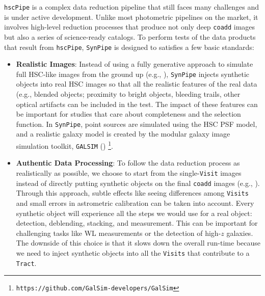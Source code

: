 \documentclass[useamsfonts]{pasj01}
\def\hscpipe{\texttt{hscPipe}}
\def\synpipe{\texttt{SynPipe}}
\def\coadd{\texttt{coadd}}
\def\tract{\texttt{Tract}}
\def\visit{\texttt{Visit}}
\def\visits{\texttt{Visits}}
\def\galsim{\texttt{G}{\scriptsize \texttt{AL}}\texttt{S}{\scriptsize \texttt{IM}}}
\begin{document}
    \hscpipe{} is a complex data reduction pipeline that still faces many challenges
    and is under active development.
    Unlike most photometric pipelines on the market, it involves high-level reduction
    processes that produce not only deep \coadd{} images but also a series of
    science-ready catalogs. 
    To perform tests of the data products that result from \hscpipe{}, \synpipe{} is 
    designed to satisfies a few basic standards:

    \begin{itemize}

        \item \textbf{Realistic Images}:
            Instead of using a fully generative approach to simulate full HSC-like
            images from the ground up (e.g., \citealt{Chang2015}), \synpipe{} injects
            synthetic objects into real HSC images so that all the realistic
            features of the real data (e.g., blended objects; proximity to bright
            objects, bleeding trails, other optical artifacts can be included in the
            test.
            The impact of these features can be important for studies that care about 
            completeness and the selection function.
            In \synpipe{}, point sources are simulated using the HSC PSF model,
            and a realistic galaxy model is created by the modular galaxy image
            simulation toolkit, \galsim{} (\citealt{Rowe2015})
            \footnote{\texttt{https://github.com/GalSim-developers/GalSim}}.

        \item \textbf{Authentic Data Processing}:
            To follow the data reduction process as realistically as possible, we 
            choose to start from the single-\visit{} images instead of directly putting 
            synthetic objects on the final \coadd{} images 
            (e.g., \citealt{Suchyta2016}).
            Through this approach, subtle effects like seeing differences among
            \visits{} and small errors in astrometric calibration can be taken
            into account.
            Every synthetic object will experience all the steps we would use for a 
            real object: detection, deblending, stacking, and measurement.
            This can be important for challenging tasks like WL measurements or the 
            detection of high-$z$ galaxies.
            The downside of this choice is that it slows down the overall run-time
            because we need to inject synthetic objects into all the \visits{} that 
            contribute to a \tract{}.
        

\end{itemize}
\end{document}
